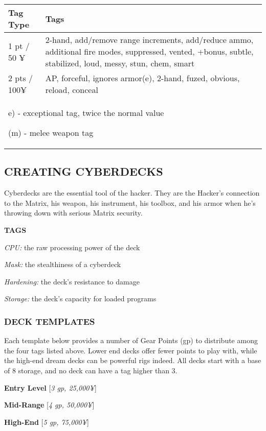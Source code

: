 \documentclass[oneside,10pt]{article}
\begin{document}
\begin{multicols}{2}
\begin{center}
\begin{tabular}{lp{5.5cm}}
\toprule
Tag Type& Tags\\
\midrule
1 pt / 50 ¥ & 2-hand, add/remove range increments, add/reduce ammo, additional fire modes, suppressed, vented, +bonus, subtle, stabilized, loud, messy, stun, chem, smart\\
2 pts / 100¥ & AP, forceful, ignores armor(e), 2-hand, fuzed, obvious, reload, conceal\\
\multicolumn{2}{p{5.5cm}}{e) - exceptional tag, twice the normal value

(m) - melee weapon tag
}\\
\bottomrule
\end{tabular}
\end{center}


\subsection{CREATING CYBERDECKS}
Cyberdecks are the essential tool of the hacker. They are the
Hacker’s connection to the Matrix, his weapon, his instrument, his toolbox, and his armor when he’s throwing down
with serious Matrix security.

\textbf{TAGS
}
\begin{adjustwidth*}{.5cm}{.5cm}

\textit{CPU:} the raw processing power of the deck

\textit{Mask:} the stealthiness of a cyberdeck

\textit{Hardening:} the deck’s resistance to damage

\textit{Storage:} the deck’s capacity for loaded programs
\end{adjustwidth*}

\subsubsection{DECK TEMPLATES}
Each template below provides a number of Gear Points (gp)
to distribute among the four tags listed above. Lower end
decks offer fewer points to play with, while the high-end
dream decks can be powerful rigs indeed. All decks start with
a base of 8 storage, and no deck can have a tag higher than 3.

\textbf{Entry Level} [\textit{3 gp, 25,000¥}]

\textbf{Mid-Range} [\textit{4 gp, 50,000¥}]

\textbf{High-End} [\textit{5 gp, 75,000¥}]


\end{multicols}
\end{document}
